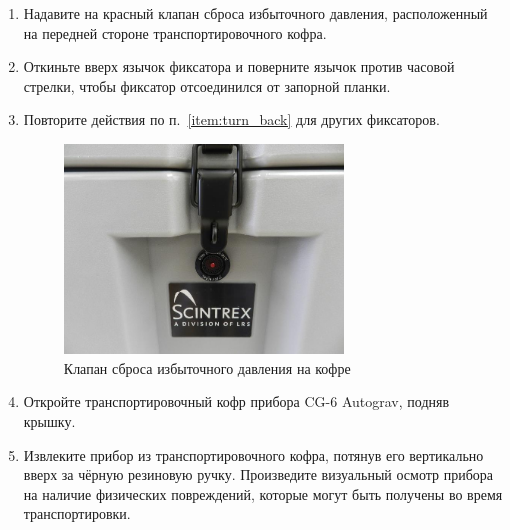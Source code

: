 \begin{enumerate}
  \item Надавите на красный клапан сброса избыточного давления, расположенный на
    передней стороне транспортировочного кофра.

  \item\label{item:turn_back} Откиньте вверх язычок фиксатора и поверните язычок против часовой
    стрелки, чтобы фиксатор отсоединился от запорной планки.

  \item Повторите действия по п.~\ref{item:turn_back} для других фиксаторов.

  \begin{figure}[h]
    \centering
    \includegraphics[width=0.7\textwidth]{figures/location_of_the_pressure_release_value_on_the_transportation_case}
    \caption{Клапан сброса избыточного давления на кофре}
    \label{fig:location_of_the_pressure_release_value_on_the_transportation_case}
  \end{figure}

  \item Откройте транспортировочный кофр прибора CG-6
    Autograv\texttrademark{}, подняв крышку.

  \item Извлеките прибор \cg{} из транспортировочного
    кофра, потянув его вертикально вверх за чёрную резиновую ручку. Произведите
    визуальный осмотр прибора на наличие физических повреждений, которые могут
    быть получены во время транспортировки.
\end{enumerate}


